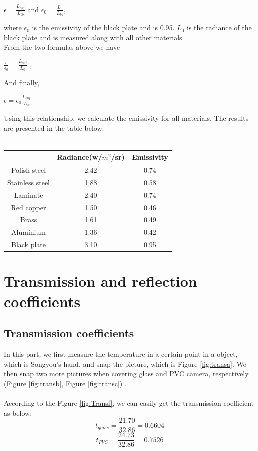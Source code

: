\documentclass[english]{article}
\begin{document}
\begin{center}
$\epsilon = \frac{L_{obj}}{L_{bb}} $ and $\epsilon_{0} = \frac{L_{0}}{L_{bb}} $,
\end{center}
where $\epsilon_{0}$ is the emissivity of the black plate and is 0.95. $L_{0}$ is the radiance of the black plate and is measured along with all other materials.\\
From the two formulas above we have\\
\begin{center}
$\frac{\epsilon}{\epsilon_{0}} = \frac{L_{obj}}{L_{0}} $ ,
\end{center}
And finally,\\
\begin{center}
$\epsilon = \epsilon_{0} \frac{L_{obj}}{L_{0}} $

\end{center}
Using this relationship, we calculate the emissivity for all materials. 
The results are presented in the table below.\\
\\
\begin{center}
\begin{tabular}{|c|c|c|}
\hline 
 & Radiance(w/$m^{2}$/sr) & Emissivity\tabularnewline
\hline 
\hline 
Polish steel & 2.42 & 0.74\tabularnewline
\hline 
Stainless steel & 1.88 & 0.58\tabularnewline
\hline 
Laminate & 2.40 & 0.74\tabularnewline
\hline 
Red copper & 1.50 & 0.46\tabularnewline
\hline 
Brass & 1.61 & 0.49\tabularnewline
\hline 
Aluminium & 1.36 & 0.42\tabularnewline
\hline 
Black plate & 3.10 & 0.95\tabularnewline
\hline 
\end{tabular}
\end{center}

\section{Transmission and reflection coefficients}
\subsection{Transmission coefficients}
In this part, we first measure the temperature in a certain point in a object, which is Songyou's hand, and snap the picture, which is Figure \ref{fig:transa}.
We then snap two more pictures when covering glass and PVC  camera, respectively (Figure \ref{fig:transb}, Figure \ref{fig:transc}) .\\
\\
According to the Figure \ref{fig:Transf}, we can easily get the transmission coefficient as below:
$$
t_{glass} = \frac{21.70}{32.86} = 0.6604
$$
$$
t_{PVC} = \frac{24.73}{32.86} = 0.7526
$$
\end{document}
